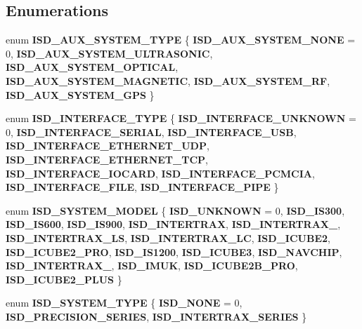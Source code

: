 \subsection*{\-Enumerations}
\begin{DoxyCompactItemize}
\item 
enum {\bf \-I\-S\-D\-\_\-\-A\-U\-X\-\_\-\-S\-Y\-S\-T\-E\-M\-\_\-\-T\-Y\-P\-E} \{ \*
{\bf \-I\-S\-D\-\_\-\-A\-U\-X\-\_\-\-S\-Y\-S\-T\-E\-M\-\_\-\-N\-O\-N\-E} =  0, 
{\bf \-I\-S\-D\-\_\-\-A\-U\-X\-\_\-\-S\-Y\-S\-T\-E\-M\-\_\-\-U\-L\-T\-R\-A\-S\-O\-N\-I\-C}, 
{\bf \-I\-S\-D\-\_\-\-A\-U\-X\-\_\-\-S\-Y\-S\-T\-E\-M\-\_\-\-O\-P\-T\-I\-C\-A\-L}, 
{\bf \-I\-S\-D\-\_\-\-A\-U\-X\-\_\-\-S\-Y\-S\-T\-E\-M\-\_\-\-M\-A\-G\-N\-E\-T\-I\-C}, 
\*
{\bf \-I\-S\-D\-\_\-\-A\-U\-X\-\_\-\-S\-Y\-S\-T\-E\-M\-\_\-\-R\-F}, 
{\bf \-I\-S\-D\-\_\-\-A\-U\-X\-\_\-\-S\-Y\-S\-T\-E\-M\-\_\-\-G\-P\-S}
 \}
\item 
enum {\bf \-I\-S\-D\-\_\-\-I\-N\-T\-E\-R\-F\-A\-C\-E\-\_\-\-T\-Y\-P\-E} \{ \*
{\bf \-I\-S\-D\-\_\-\-I\-N\-T\-E\-R\-F\-A\-C\-E\-\_\-\-U\-N\-K\-N\-O\-W\-N} =  0, 
{\bf \-I\-S\-D\-\_\-\-I\-N\-T\-E\-R\-F\-A\-C\-E\-\_\-\-S\-E\-R\-I\-A\-L}, 
{\bf \-I\-S\-D\-\_\-\-I\-N\-T\-E\-R\-F\-A\-C\-E\-\_\-\-U\-S\-B}, 
{\bf \-I\-S\-D\-\_\-\-I\-N\-T\-E\-R\-F\-A\-C\-E\-\_\-\-E\-T\-H\-E\-R\-N\-E\-T\-\_\-\-U\-D\-P}, 
\*
{\bf \-I\-S\-D\-\_\-\-I\-N\-T\-E\-R\-F\-A\-C\-E\-\_\-\-E\-T\-H\-E\-R\-N\-E\-T\-\_\-\-T\-C\-P}, 
{\bf \-I\-S\-D\-\_\-\-I\-N\-T\-E\-R\-F\-A\-C\-E\-\_\-\-I\-O\-C\-A\-R\-D}, 
{\bf \-I\-S\-D\-\_\-\-I\-N\-T\-E\-R\-F\-A\-C\-E\-\_\-\-P\-C\-M\-C\-I\-A}, 
{\bf \-I\-S\-D\-\_\-\-I\-N\-T\-E\-R\-F\-A\-C\-E\-\_\-\-F\-I\-L\-E}, 
\*
{\bf \-I\-S\-D\-\_\-\-I\-N\-T\-E\-R\-F\-A\-C\-E\-\_\-\-P\-I\-P\-E}
 \}
\item 
enum {\bf \-I\-S\-D\-\_\-\-S\-Y\-S\-T\-E\-M\-\_\-\-M\-O\-D\-E\-L} \{ \*
{\bf \-I\-S\-D\-\_\-\-U\-N\-K\-N\-O\-W\-N} =  0, 
{\bf \-I\-S\-D\-\_\-\-I\-S300}, 
{\bf \-I\-S\-D\-\_\-\-I\-S600}, 
{\bf \-I\-S\-D\-\_\-\-I\-S900}, 
\*
{\bf \-I\-S\-D\-\_\-\-I\-N\-T\-E\-R\-T\-R\-A\-X}, 
{\bf \-I\-S\-D\-\_\-\-I\-N\-T\-E\-R\-T\-R\-A\-X\-\_}, 
{\bf \-I\-S\-D\-\_\-\-I\-N\-T\-E\-R\-T\-R\-A\-X\-\_\-\-L\-S}, 
{\bf \-I\-S\-D\-\_\-\-I\-N\-T\-E\-R\-T\-R\-A\-X\-\_\-\-L\-C}, 
\*
{\bf \-I\-S\-D\-\_\-\-I\-C\-U\-B\-E2}, 
{\bf \-I\-S\-D\-\_\-\-I\-C\-U\-B\-E2\-\_\-\-P\-R\-O}, 
{\bf \-I\-S\-D\-\_\-\-I\-S1200}, 
{\bf \-I\-S\-D\-\_\-\-I\-C\-U\-B\-E3}, 
\*
{\bf \-I\-S\-D\-\_\-\-N\-A\-V\-C\-H\-I\-P}, 
{\bf \-I\-S\-D\-\_\-\-I\-N\-T\-E\-R\-T\-R\-A\-X\-\_}, 
{\bf \-I\-S\-D\-\_\-\-I\-M\-U\-K}, 
{\bf \-I\-S\-D\-\_\-\-I\-C\-U\-B\-E2\-B\-\_\-\-P\-R\-O}, 
\*
{\bf \-I\-S\-D\-\_\-\-I\-C\-U\-B\-E2\-\_\-\-P\-L\-U\-S}
 \}
\item 
enum {\bf \-I\-S\-D\-\_\-\-S\-Y\-S\-T\-E\-M\-\_\-\-T\-Y\-P\-E} \{ {\bf \-I\-S\-D\-\_\-\-N\-O\-N\-E} =  0, 
{\bf \-I\-S\-D\-\_\-\-P\-R\-E\-C\-I\-S\-I\-O\-N\-\_\-\-S\-E\-R\-I\-E\-S}, 
{\bf \-I\-S\-D\-\_\-\-I\-N\-T\-E\-R\-T\-R\-A\-X\-\_\-\-S\-E\-R\-I\-E\-S}
 \}
\end{DoxyCompactItemize}
